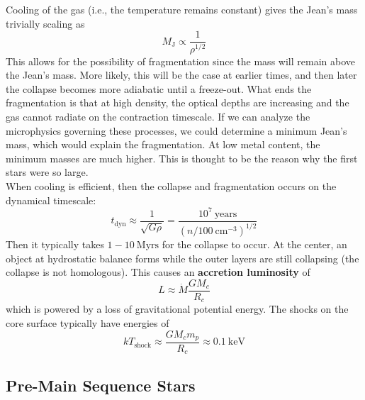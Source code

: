 \documentclass[10pt]{article}
\numberwithin{equation}{section}
\newcommand{\n}{\noindent}
\begin{document}
  \n Cooling of the gas (i.e., the temperature remains constant) gives
  the Jean's mass trivially scaling as
  \begin{equation}
    \label{eq:65}
    M_{\mathrm{J}}\propto \frac{1}{\rho^{1/2}}
  \end{equation}
  This allows for the possibility of fragmentation since the mass will
  remain above the Jean's mass. More likely, this will be the case at
  earlier times, and then later the collapse becomes more adiabatic
  until a freeze-out. What ends the fragmentation is that at high
  density, the optical depths are increasing and the gas cannot
  radiate on the contraction timescale. If we can analyze the
  microphysics governing these processes, we could determine a minimum
  Jean's mass, which would explain the fragmentation. At low metal
  content, the minimum masses are much higher. This is thought to be
  the reason why the first stars were so large.\\

  \n When cooling is efficient, then the collapse and fragmentation
  occurs on the dynamical timescale:
  \begin{equation}
    \label{eq:66}
    t_{\mathrm{dyn}}\approx \frac{1}{\sqrt{G\rho}}=\frac{10^7\
      \mathrm{years}}{(n/100\ \mathrm{cm^{-3}})^{1/2}}
  \end{equation}
  Then it typically takes $1-10\ \mathrm{Myrs}$ for the collapse to
  occur. At the center, an object at hydrostatic balance forms while
  the outer layers are still collapsing (the collapse is not
  homologous). This causes an \textbf{accretion luminosity} of
  \begin{equation}
    \label{eq:67}
    L\approx \dot{M}\frac{G M_c}{R_c}
  \end{equation}
  which is powered by a loss of gravitational potential energy. The
  shocks on the core surface typically have energies of
  \begin{equation}
    \label{eq:68}
    kT_{\mathrm{shock}}\approx \frac{GM_c m_p}{R_c}\approx 0.1\ \mathrm
{keV}
  \end{equation}

  \subsection{Pre-Main Sequence Stars}
  \label{sec:pre-main-sequence}
\end{document}
